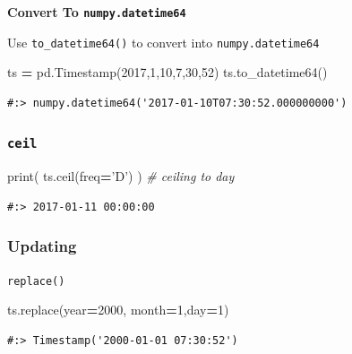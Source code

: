 \documentclass[
]{book}
\newenvironment{Shaded}{\begin{snugshade}}{\end{snugshade}}
\newcommand{\BuiltInTok}[1]{#1}
\newcommand{\CommentTok}[1]{\textcolor[rgb]{0.37,0.37,0.37}{\textit{#1}}}
\newcommand{\DecValTok}[1]{\textcolor[rgb]{0.06,0.06,0.06}{#1}}
\newcommand{\NormalTok}[1]{#1}
\newcommand{\OperatorTok}[1]{\textcolor[rgb]{0.43,0.43,0.43}{\textbf{#1}}}
\newcommand{\StringTok}[1]{\textcolor[rgb]{0.5,0.5,0.5}{#1}}
\begin{document}
\textbf{Convert To \texttt{numpy.datetime64}}

Use \texttt{to\_datetime64()} to convert into \texttt{numpy.datetime64}

\begin{Shaded}
\begin{Highlighting}[]
\NormalTok{ts }\OperatorTok{=}\NormalTok{ pd.Timestamp(}\DecValTok{2017}\NormalTok{,}\DecValTok{1}\NormalTok{,}\DecValTok{10}\NormalTok{,}\DecValTok{7}\NormalTok{,}\DecValTok{30}\NormalTok{,}\DecValTok{52}\NormalTok{)}
\NormalTok{ts.to_datetime64()}
\end{Highlighting}
\end{Shaded}

\begin{verbatim}
#:> numpy.datetime64('2017-01-10T07:30:52.000000000')
\end{verbatim}

\hypertarget{ceil}{%
\subsubsection{\texorpdfstring{\texttt{ceil}}{ceil}}\label{ceil}}

\begin{Shaded}
\begin{Highlighting}[]
\BuiltInTok{print}\NormalTok{( ts.ceil(freq}\OperatorTok{=}\StringTok{'D'}\NormalTok{) ) }\CommentTok{# ceiling to day}
\end{Highlighting}
\end{Shaded}

\begin{verbatim}
#:> 2017-01-11 00:00:00
\end{verbatim}

\hypertarget{updating}{%
\subsubsection{Updating}\label{updating}}

\texttt{replace()}

\begin{Shaded}
\begin{Highlighting}[]
\NormalTok{ts.replace(year}\OperatorTok{=}\DecValTok{2000}\NormalTok{, month}\OperatorTok{=}\DecValTok{1}\NormalTok{,day}\OperatorTok{=}\DecValTok{1}\NormalTok{)}
\end{Highlighting}
\end{Shaded}

\begin{verbatim}
#:> Timestamp('2000-01-01 07:30:52')
\end{verbatim}
\end{document}

